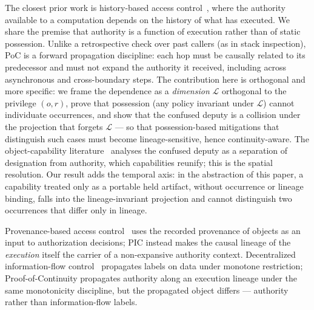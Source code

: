 \documentclass[11pt]{article}
\begin{document}
The closest prior work is history-based access control~\cite{abadi2003history},
where the authority available to a computation depends on the history of
what has executed. We share the premise that authority is a function of
execution rather than of static possession. Unlike a retrospective check over
past callers (as in stack inspection), PoC is a forward propagation discipline:
each hop must be causally related to its predecessor and must not expand the
authority it received, including across asynchronous and cross-boundary steps.
The contribution here is orthogonal
and more specific: we frame the dependence as a \emph{dimension} $\mathcal{L}$
orthogonal to the privilege $(o,r)$, prove that possession (any policy invariant
under $\mathcal{L}$) cannot individuate occurrences, and show that the confused
deputy is a collision under the projection that forgets
$\mathcal{L}$ --- so that possession-based mitigations that distinguish such
cases must become lineage-sensitive, hence continuity-aware. The
object-capability literature~\cite{miller2006robust} analyses the confused
deputy as a separation of designation from authority, which capabilities
reunify; this is the spatial resolution. Our result adds the temporal axis: in the abstraction of this paper, a capability
treated only as a portable held artifact, without occurrence or lineage binding,
falls into the lineage-invariant projection and cannot distinguish two
occurrences that differ only in lineage.

Provenance-based access control~\cite{park2012provenance} uses the recorded
provenance of objects as an input to authorization decisions; PIC instead makes
the causal lineage of the \emph{execution} itself the carrier of a non-expansive
authority context. Decentralized information-flow
control~\cite{myers1997decentralized} propagates labels on data under monotone
restriction; Proof-of-Continuity propagates authority along an execution lineage
under the same monotonicity discipline, but the propagated object differs ---
authority rather than information-flow labels.
\end{document}
